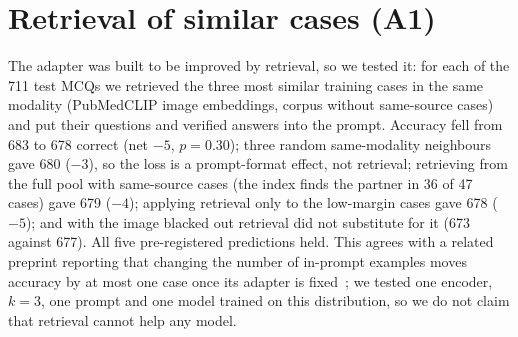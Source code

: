 \begin{table}[h]
  \centering
  \footnotesize
  \setlength{\tabcolsep}{2.5pt}
  \caption{\textbf{Planted length cue on PMC-VQA (A13).} Percentages unless stated; ``gap'' is accuracy with the true minus with a black image in points. Predictions I1, I3 and I4 held for all three systems; I2 (at least 30\% of questions with a black-image margin $\ge0.99$) did not.}
  \label{tab:a13}
\end{table}


\section{Retrieval of similar cases (A1)}
\label{app:retr}

The adapter was built to be improved by retrieval, so we tested it: for each of the 711 test MCQs we retrieved the three most similar training cases in the same modality (PubMedCLIP image embeddings, corpus without same-source cases) and put their questions and verified answers into the prompt.
Accuracy fell from 683 to 678 correct (net $-5$, $p=0.30$); three random same-modality neighbours gave 680 ($-3$), so the loss is a prompt-format effect, not retrieval; retrieving from the full pool with same-source cases (the index finds the partner in 36 of 47 cases) gave 679 ($-4$); applying retrieval only to the low-margin cases gave 678 ($-5$); and with the image blacked out retrieval did not substitute for it (673 against 677).
All five pre-registered predictions held.
This agrees with a related preprint reporting that changing the number of in-prompt examples moves accuracy by at most one case once its adapter is fixed~\cite{kirscher2026optionaware}; we tested one encoder, $k=3$, one prompt and one model trained on this distribution, so we do not claim that retrieval cannot help any model.

